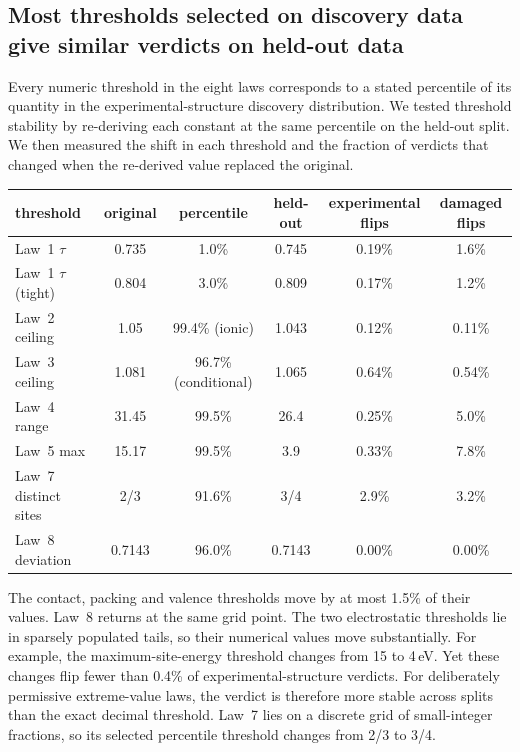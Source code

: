 \subsection{Most thresholds selected on discovery data give similar verdicts on held-out data}

Every numeric threshold in the eight laws corresponds to a stated percentile of its quantity
in the experimental-structure discovery distribution. We tested threshold stability by
re-deriving each constant at the same percentile on the held-out split. We then measured
the shift in each threshold and the fraction of verdicts that changed when the re-derived
value replaced the original.

\begin{center}
\small
\setlength{\tabcolsep}{3pt}
\begin{tabular}{lccccc}
\hline
threshold & original & percentile & held-out & experimental flips & damaged flips \\
\hline
Law~1 $\tau$ & 0.735 & 1.0\% & 0.745 & 0.19\% & 1.6\% \\
Law~1 $\tau$ (tight) & 0.804 & 3.0\% & 0.809 & 0.17\% & 1.2\% \\
Law~2 ceiling & 1.05 & 99.4\% (ionic) & 1.043 & 0.12\% & 0.11\% \\
Law~3 ceiling & 1.081 & 96.7\% (conditional) & 1.065 & 0.64\% & 0.54\% \\
Law~4 range & 31.45 & 99.5\% & 26.4 & 0.25\% & 5.0\% \\
Law~5 max & 15.17 & 99.5\% & 3.9 & 0.33\% & 7.8\% \\
Law~7 distinct sites & 2/3 & 91.6\% & 3/4 & 2.9\% & 3.2\% \\
Law~8 deviation & 0.7143 & 96.0\% & 0.7143 & 0.00\% & 0.00\% \\
\hline
\end{tabular}
\end{center}

The contact, packing and valence
thresholds move by at most 1.5\% of their values. Law~8
returns at the same grid point. The two electrostatic thresholds lie in sparsely populated
tails, so their numerical values move substantially. For example, the maximum-site-energy
threshold changes from 15 to 4\,eV. Yet these changes flip fewer than 0.4\% of
experimental-structure verdicts. For deliberately permissive extreme-value laws, the
verdict is therefore more stable across splits than the exact decimal threshold. Law~7
lies on a discrete grid of small-integer fractions, so its selected percentile threshold
changes from 2/3 to 3/4.

